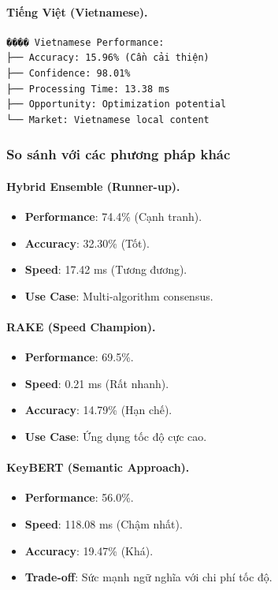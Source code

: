 \paragraph{Tiếng Việt (Vietnamese).}
\begin{verbatim}
���� Vietnamese Performance:
├── Accuracy: 15.96% (Cần cải thiện)
├── Confidence: 98.01%
├── Processing Time: 13.38 ms
├── Opportunity: Optimization potential
└── Market: Vietnamese local content
\end{verbatim}

\subsubsection{So sánh với các phương pháp khác}

\paragraph{Hybrid Ensemble (Runner-up).}
\begin{itemize}
  \item \textbf{Performance}: 74.4\% (Cạnh tranh).
  \item \textbf{Accuracy}: 32.30\% (Tốt).
  \item \textbf{Speed}: 17.42 ms (Tương đương).
  \item \textbf{Use Case}: Multi-algorithm consensus.
\end{itemize}

\paragraph{RAKE (Speed Champion).}
\begin{itemize}
  \item \textbf{Performance}: 69.5\%.
  \item \textbf{Speed}: 0.21 ms (Rất nhanh).
  \item \textbf{Accuracy}: 14.79\% (Hạn chế).
  \item \textbf{Use Case}: Ứng dụng tốc độ cực cao.
\end{itemize}

\paragraph{KeyBERT (Semantic Approach).}
\begin{itemize}
  \item \textbf{Performance}: 56.0\%.
  \item \textbf{Speed}: 118.08 ms (Chậm nhất).
  \item \textbf{Accuracy}: 19.47\% (Khá).
  \item \textbf{Trade-off}: Sức mạnh ngữ nghĩa với chi phí tốc độ.
\end{itemize}


